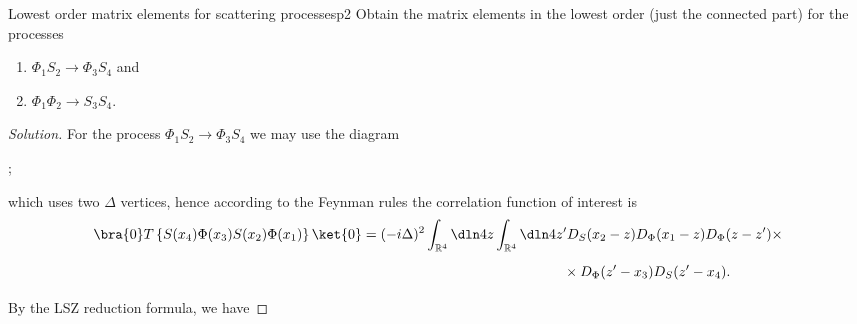 \begin{problem}{Lowest order matrix elements for scattering processes}{p2}
   Obtain the matrix elements in the lowest order (just the connected part) for the processes
   \begin{enumerate}[label=(\alph*)]
       \item \(\Phi_1 S_2 \to \Phi_3 S_4\) and
       \item \(\Phi_1 \Phi_2 \to S_3 S_4\).
   \end{enumerate}
\end{problem}
\begin{proof}[Solution]
   For the process \(\Phi_1 S_2 \to \Phi_3 S_4\) we may use the diagram
   \begin{center}
      ;
   \end{center}
   which uses two \(\Delta\) vertices, hence according to the Feynman rules the correlation function of interest is
   \begin{align*}
      \bra{0}T\left\{S(x_4)\Phi(x_3)S(x_2)\Phi(x_1)\right\}\ket{0} &= (-i\Delta)^2 \int_{\mathbb{R}^4}\dln4z \int_{\mathbb{R}^4} \dln4{z'} D_S(x_2 - z) D_\Phi(x_1 - z) D_\Phi(z - z') \times\\
                                                                   &{\phantom{= (-i\Delta)^2 \int_{\mathbb{R}^4}\dln4z \int_{\mathbb{R}^4} \dln4{z'}}} \times D_\Phi(z' - x_3) D_S(z' - x_4).
   \end{align*}
   By the LSZ reduction formula, we have
\end{proof}
